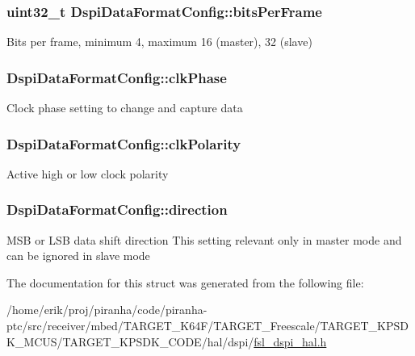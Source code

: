 \subsubsection[{\texorpdfstring{bits\+Per\+Frame}{bitsPerFrame}}]{\setlength{\rightskip}{0pt plus 5cm}uint32\+\_\+t Dspi\+Data\+Format\+Config\+::bits\+Per\+Frame}\hypertarget{structDspiDataFormatConfig_ac63c29bae9be526eb82eb9188a3685d4}{}\label{structDspiDataFormatConfig_ac63c29bae9be526eb82eb9188a3685d4}
Bits per frame, minimum 4, maximum 16 (master), 32 (slave) 
\subsubsection[{\texorpdfstring{clk\+Phase}{clkPhase}}]{ Dspi\+Data\+Format\+Config\+::clk\+Phase}\hypertarget{structDspiDataFormatConfig_a6a28276cf9ea7163033dc4d69a6162ff}{}\label{structDspiDataFormatConfig_a6a28276cf9ea7163033dc4d69a6162ff}
Clock phase setting to change and capture data 
\subsubsection[{\texorpdfstring{clk\+Polarity}{clkPolarity}}]{ Dspi\+Data\+Format\+Config\+::clk\+Polarity}\hypertarget{structDspiDataFormatConfig_a6351c261cb1ec33e415c3cfe5118acb9}{}\label{structDspiDataFormatConfig_a6351c261cb1ec33e415c3cfe5118acb9}
Active high or low clock polarity 
\subsubsection[{\texorpdfstring{direction}{direction}}]{ Dspi\+Data\+Format\+Config\+::direction}\hypertarget{structDspiDataFormatConfig_ad0c3a440790fa062778dfa1f4ca48175}{}\label{structDspiDataFormatConfig_ad0c3a440790fa062778dfa1f4ca48175}
M\+SB or L\+SB data shift direction This setting relevant only in master mode and can be ignored in slave mode 

The documentation for this struct was generated from the following file\+:\begin{DoxyCompactItemize}
\item 
/home/erik/proj/piranha/code/piranha-\/ptc/src/receiver/mbed/\+T\+A\+R\+G\+E\+T\+\_\+\+K64\+F/\+T\+A\+R\+G\+E\+T\+\_\+\+Freescale/\+T\+A\+R\+G\+E\+T\+\_\+\+K\+P\+S\+D\+K\+\_\+\+M\+C\+U\+S/\+T\+A\+R\+G\+E\+T\+\_\+\+K\+P\+S\+D\+K\+\_\+\+C\+O\+D\+E/hal/dspi/\hyperlink{fsl__dspi__hal_8h}{fsl\+\_\+dspi\+\_\+hal.\+h}\end{DoxyCompactItemize}
